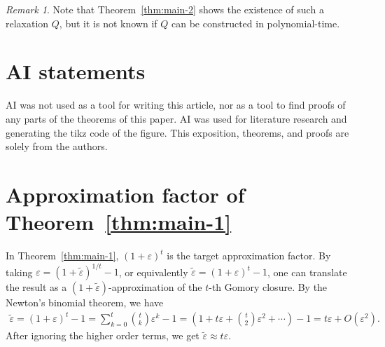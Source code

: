 \documentclass[11pt]{article}
\newcommand{\eps}{\varepsilon}
\newcommand{\numrounds}{t}
\newcommand{\rb}[1]{\left(#1\right)}
\theoremstyle{remark}
\newtheorem{remark}{Remark}
\begin{document}
\begin{remark}
	Note that Theorem~\ref{thm:main-2} shows the existence of such a relaxation $Q$, but it is not known if $Q$ can be constructed in polynomial-time. 
\end{remark}




\section*{AI statements}
AI was not used as a tool for writing this article, nor as a tool to find proofs of any parts of the theorems of this paper. 
AI was used for literature research and generating the tikz code of the figure. This exposition, theorems, and proofs are solely from the authors. 

{}
\printbibliography

\appendix

\section{Approximation factor of Theorem~\ref{thm:main-1}}\label{appendix:approx-factor}
In Theorem~\ref{thm:main-1}, $(1+\eps)^\numrounds$ is the target approximation factor. By taking $\eps = (1+\tilde{\eps})^{1/\numrounds} - 1$, or equivalently $\tilde{\eps} = (1+\eps)^t-1$, one can translate the result as a $(1+\tilde{\eps})$-approximation of the $\numrounds$-th Gomory closure. 
By the Newton's binomial theorem, we have
\begin{align*}
    \tilde{\eps} = (1+\eps)^t - 1 = \sum_{k=0}^\numrounds {\numrounds \choose k} \eps^k - 1 = \rb{1+t\eps+\binom{t}{2}\eps^2 +\cdots} - 1 = t\eps + O(\eps^2).
\end{align*}
After ignoring the higher order terms, we get $\tilde{\eps} \approx t\eps$.
\end{document}
